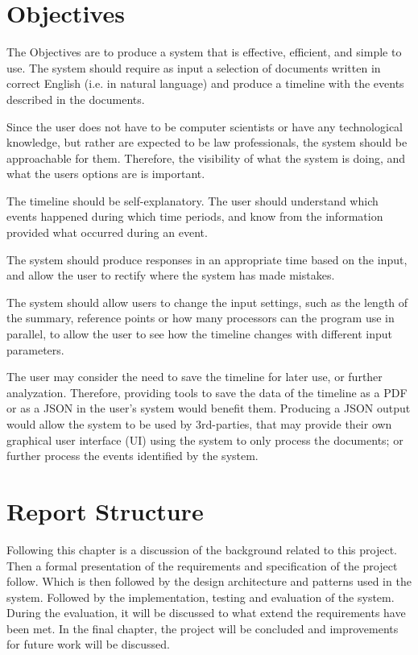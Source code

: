 \documentclass[11pt]{informatics-report}
\begin{document}
\section{Objectives}
\par The Objectives are to produce a system that is effective, efficient, and simple to use. The system should require as input a selection of documents written in correct English (i.e. in natural language) and produce a timeline with the events described in the documents.
\par Since the user does not have to be computer scientists or have any technological knowledge, but rather are expected to be law professionals, the system should be approachable for them. Therefore, the visibility of what the system is doing, and what the users options are is important. 
\par The timeline should be self-explanatory. The user should understand which events happened during which time periods, and know from the information provided what occurred during an event. 
\par The system should produce responses in an appropriate time based on the input, and allow the user to rectify where the system has made mistakes. 
\par The system should allow users to change the input settings, such as the length of the summary, reference points or how many processors can the program use in parallel, to allow the user to see how the timeline changes with different input parameters.
\par The user may consider the need to save the timeline for later use, or further analyzation. Therefore, providing tools to save the data of the timeline as a PDF or as a JSON in the user's system would benefit them. Producing a JSON output would allow the system to be used by 3rd-parties, that may provide their own graphical user interface (UI) using the system to only process the documents; or further process the events identified by the system.
\section{Report Structure}
\par Following this chapter is a discussion of the background related to this project. Then a formal presentation of the requirements and specification of the project follow. Which is then followed by the design architecture and patterns used in the system. Followed by the implementation, testing and evaluation of the system. During the evaluation, it will be discussed to what extend the requirements have been met. In the final chapter, the project will be concluded and improvements for future work will be discussed.
\end{document}
